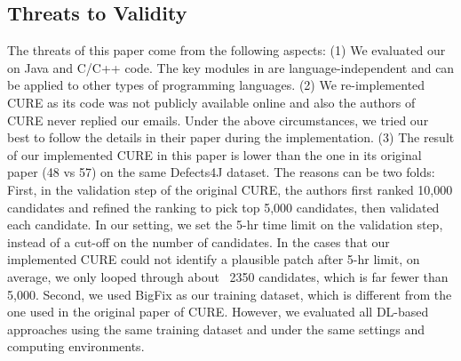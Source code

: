 \subsection{Threats to Validity}
The threats of this paper come from the following aspects: 
(1) We evaluated our {\tool} on Java and C/C++ code. 
The key modules in {\tool} are language-independent and can be applied to
other types of programming languages. 
(2) We re-implemented CURE as its code was not publicly available online and also the authors of CURE never replied our emails. Under the above circumstances, we tried our best to follow the details in their paper during the implementation. 
(3) The result of our implemented CURE in this paper is lower than the one in its original paper (48 vs 57) on the same Defects4J dataset. The reasons can be two folds: First, in the validation step of the original CURE, the authors first ranked 10,000 candidates and refined the ranking to pick top 5,000 candidates, then validated each candidate. 
In our setting, we set the 5-hr time limit on the validation step, instead of a cut-off on the number of candidates. In the cases that our implemented CURE could not identify a plausible patch after 5-hr limit, on average, we only looped through about ~2350 candidates, which is far fewer than 5,000. Second, we used BigFix as our training dataset, which is different from the one used in the original paper of CURE. However, we evaluated all DL-based approaches using the same training dataset and under the same settings and computing environments. 





